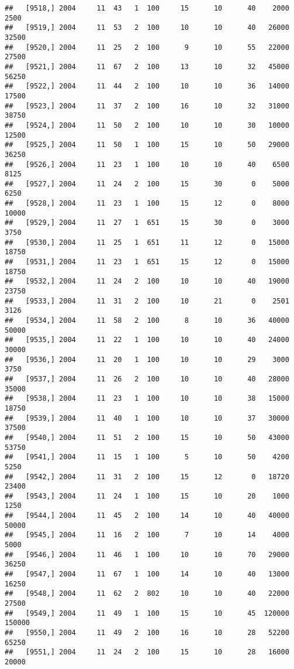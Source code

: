 \documentclass{article}\usepackage[]{graphicx}\usepackage[]{color}
\makeatletter
\newenvironment{kframe}{%
 \def\at@end@of@kframe{}%
 \ifinner\ifhmode%
  \def\at@end@of@kframe{\end{minipage}}%
  \begin{minipage}{\columnwidth}%
 \fi\fi%
 \def\FrameCommand##1{\hskip\@totalleftmargin \hskip-\fboxsep
 \colorbox{shadecolor}{##1}\hskip-\fboxsep
     \hskip-\linewidth \hskip-\@totalleftmargin \hskip\columnwidth}%
 \MakeFramed {\advance\hsize-\width
   \@totalleftmargin\z@ \linewidth\hsize
   \@setminipage}}%
 {\par\unskip\endMakeFramed%
 \at@end@of@kframe}
\newenvironment{knitrout}{}{} %
\makeatother
\begin{document}
\begin{knitrout}
\begin{kframe}
\begin{verbatim}
##   [9518,] 2004     11  43   1  100     15      10      40    2000    2500
##   [9519,] 2004     11  53   2  100     10      10      40   26000   32500
##   [9520,] 2004     11  25   2  100      9      10      55   22000   27500
##   [9521,] 2004     11  67   2  100     13      10      32   45000   56250
##   [9522,] 2004     11  44   2  100     10      10      36   14000   17500
##   [9523,] 2004     11  37   2  100     16      10      32   31000   38750
##   [9524,] 2004     11  50   2  100     10      10      30   10000   12500
##   [9525,] 2004     11  50   1  100     15      10      50   29000   36250
##   [9526,] 2004     11  23   1  100     10      10      40    6500    8125
##   [9527,] 2004     11  24   2  100     15      30       0    5000    6250
##   [9528,] 2004     11  23   1  100     15      12       0    8000   10000
##   [9529,] 2004     11  27   1  651     15      30       0    3000    3750
##   [9530,] 2004     11  25   1  651     11      12       0   15000   18750
##   [9531,] 2004     11  23   1  651     15      12       0   15000   18750
##   [9532,] 2004     11  24   2  100     10      10      40   19000   23750
##   [9533,] 2004     11  31   2  100     10      21       0    2501    3126
##   [9534,] 2004     11  58   2  100      8      10      36   40000   50000
##   [9535,] 2004     11  22   1  100     10      10      40   24000   30000
##   [9536,] 2004     11  20   1  100     10      10      29    3000    3750
##   [9537,] 2004     11  26   2  100     10      10      40   28000   35000
##   [9538,] 2004     11  23   1  100     10      10      38   15000   18750
##   [9539,] 2004     11  40   1  100     10      10      37   30000   37500
##   [9540,] 2004     11  51   2  100     15      10      50   43000   53750
##   [9541,] 2004     11  15   1  100      5      10      50    4200    5250
##   [9542,] 2004     11  31   2  100     15      12       0   18720   23400
##   [9543,] 2004     11  24   1  100     15      10      20    1000    1250
##   [9544,] 2004     11  45   2  100     14      10      40   40000   50000
##   [9545,] 2004     11  16   2  100      7      10      14    4000    5000
##   [9546,] 2004     11  46   1  100     10      10      70   29000   36250
##   [9547,] 2004     11  67   1  100     14      10      40   13000   16250
##   [9548,] 2004     11  62   2  802     10      10      40   22000   27500
##   [9549,] 2004     11  49   1  100     15      10      45  120000  150000
##   [9550,] 2004     11  49   2  100     16      10      28   52200   65250
##   [9551,] 2004     11  24   2  100     15      10      28   16000   20000

\end{verbatim}
\end{kframe}
\end{knitrout}
\end{document}
